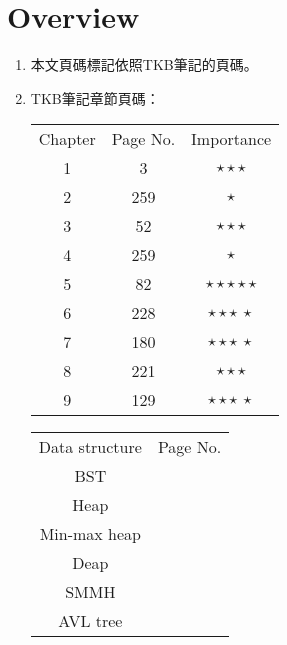 \section{Overview}

\begin{enumerate}
    \item 本文頁碼標記依照TKB筆記\cite{1}的頁碼。
    \item TKB筆記\cite{1}章節頁碼：
    \begin{table}[H]
        \centering
        \begin{tabular}{|c|c|c|}
            \hline
            Chapter & Page No. & Importance \\
            \Xhline{2\arrayrulewidth}
            1 & 3 & $\star\star\star$ \\
            \hline
            2 & 259 & $\star$ \\
            \hline
            3 & 52 & $\star\star\star$ \\
            \hline
            4 & 259 & $\star$ \\
            \hline
            5 & 82 & $\star\star\star\star\star$ \\
            \hline
            6 & 228 & $\star\star\star \ \star$ \\
            \hline
            7 & 180 & $\star\star\star \ \star$ \\
            \hline
            8 & 221 & $\star\star\star$ \\
            \hline
            9 & 129 & $\star\star\star \ \star$ \\
            \hline
        \end{tabular}
    \end{table}
    \begin{table}[H]
        \centering
        \begin{tabular}{|c|c|}
            \hline
            Data structure & Page No. \\
            \Xhline{2\arrayrulewidth}
            BST & \pageref{bst} \\
            \hline
            Heap & \pageref{heap} \\
            \hline
            Min-max heap & \pageref{min-maxheap} \\
            \hline
            Deap & \pageref{deap} \\
            \hline
            SMMH & \pageref{smmh} \\
            \hline
            AVL tree & \pageref{avltree} \\

\end{tabular}
\end{table}
\end{enumerate}

